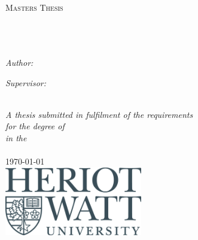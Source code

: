 \begin{titlepage}

    \begin{center}
    
        \textsc{\LARGE \univname}\\[1.5cm] %
        \textsc{\Large Masters Thesis}\\[0.5cm] %
        
        \HRule \\[0.4cm] %
        {\huge \bfseries \ttitle}\\[0.4cm] %
        \HRule \\[1.5cm] %
        
        \begin{minipage}{0.4\textwidth}
        \begin{flushleft} \large
        \emph{Author:}\\
        \href{http://www.johnsmith.com}{\authornames} %
        \end{flushleft}
        \end{minipage}
        \begin{minipage}{0.4\textwidth}
        \begin{flushright} \large
        \emph{Supervisor:} \\
        \href{http://www.jamessmith.com}{\supname} %
        \end{flushright}
        \end{minipage}\\[3cm]
        
        \large \textit{A thesis submitted in fulfilment of the requirements\\ for the degree of \degreename}\\[0.3cm] %
        \textit{in the}\\[0.4cm]
        
        \deptname\\[2cm] %
        
        {\large \today}\\[1cm] %
        \includegraphics[width=6cm]{./Figures/HWUlogo.jpg} %
        
        \vfill

    \end{center}
    
\end{titlepage}